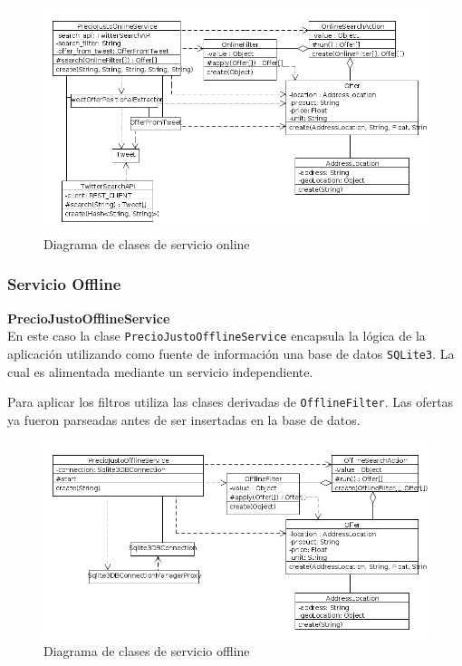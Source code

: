 \begin{figure}[h]
\centerline{\includegraphics[width=\textwidth]{./imgs/class_diagram_online_service.png}}
\caption{Diagrama de clases de servicio online}
\label{fig:class_online_service}
\end{figure}

\subsubsection{Servicio Offline}

\textbf{PrecioJustoOfflineService}\\

En este caso la clase \texttt{PrecioJustoOfflineService} encapsula la l\'ogica de la aplicaci\'on utilizando como fuente de informaci\'on una base de datos \texttt{SQLite3}. La cual es alimentada mediante un servicio independiente.

Para aplicar los filtros utiliza las clases derivadas de \texttt{OfflineFilter}. Las ofertas
ya fueron parseadas antes de ser insertadas en la base de datos.

\begin{figure}[h]
\centerline{\includegraphics[width=\textwidth]{./imgs/class_diagram_offline_service.png}}
\caption{Diagrama de clases de servicio offline}
\label{fig:class_offline_service}
\end{figure}

